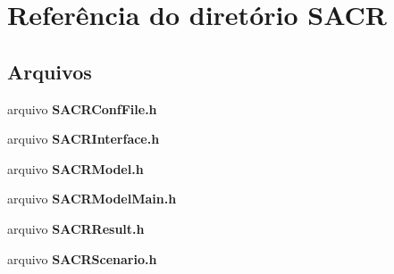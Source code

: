 \section{Referência do diretório S\+A\+CR}
\label{dir_0255c39530cc5637dbed9491e908e09f}
\subsection*{Arquivos}
\begin{DoxyCompactItemize}
\item 
arquivo {\bf S\+A\+C\+R\+Conf\+File.\+h}
\item 
arquivo {\bf S\+A\+C\+R\+Interface.\+h}
\item 
arquivo {\bf S\+A\+C\+R\+Model.\+h}
\item 
arquivo {\bf S\+A\+C\+R\+Model\+Main.\+h}
\item 
arquivo {\bf S\+A\+C\+R\+Result.\+h}
\item 
arquivo {\bf S\+A\+C\+R\+Scenario.\+h}
\end{DoxyCompactItemize}
